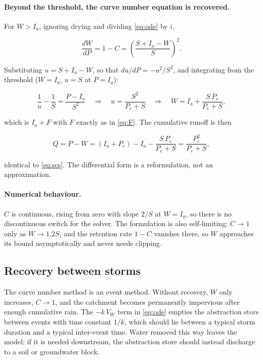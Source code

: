 \documentclass[11pt,a4paper]{article}
\begin{document}
\paragraph{Beyond the threshold, the curve number equation is recovered.}
For $W>I_a$, ignoring drying and dividing \eqref{eq:ode} by $i$,

\begin{equation}
\frac{dW}{dP}=1-C=\left(\frac{S+I_a-W}{S}\right)^{2}.
\end{equation}

\noindent
Substituting $u=S+I_a-W$, so that $du/dP=-u^{2}/S^{2}$, and integrating from
the threshold ($W=I_a$, $u=S$ at $P=I_a$):

\begin{equation}
\frac{1}{u}-\frac{1}{S}=\frac{P-I_a}{S^{2}}
\quad\Longrightarrow\quad
u=\frac{S^{2}}{P_e+S}
\quad\Longrightarrow\quad
W=I_a+\frac{S\,P_e}{P_e+S},
\end{equation}

\noindent
which is $I_a+F$ with $F$ exactly as in \eqref{eq:F}. The cumulative runoff is
then

\begin{equation}
Q=P-W=(I_a+P_e)-I_a-\frac{S\,P_e}{P_e+S}=\frac{P_e^{2}}{P_e+S},
\end{equation}

\noindent
identical to \eqref{eq:scs}. The differential form is a reformulation, not an
approximation.

\paragraph{Numerical behaviour.}
$C$ is continuous, rising from zero with slope $2/S$ at $W=I_a$, so there is no
discontinuous switch for the solver. The formulation is also self-limiting:
$C\to1$ only as $W\to1.2S$, and the retention rate $1-C$ vanishes there, so $W$
approaches its bound asymptotically and never needs clipping.

\subsection{Recovery between storms}\label{sec:recovery}

The curve number method is an event method. Without recovery, $W$ only
increases, $C\to1$, and the catchment becomes permanently impervious after
enough cumulative rain. The $-k\,V_W$ term in \eqref{eq:ode} empties the
abstraction store between events with time constant $1/k$, which should lie
between a typical storm duration and a typical inter-event time. Water removed
this way leaves the model; if it is needed downstream, the abstraction store
should instead discharge to a soil or groundwater block.
\end{document}
